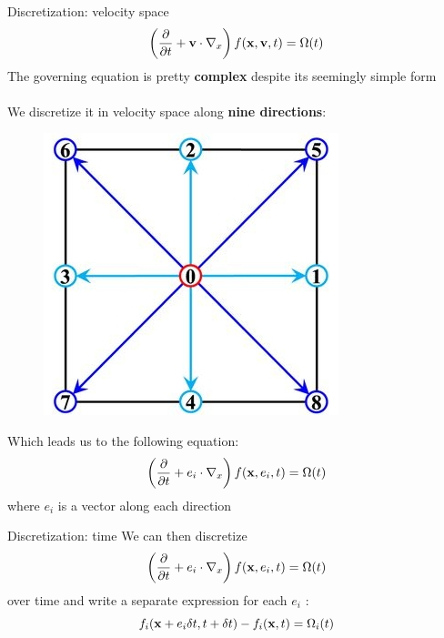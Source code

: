\documentclass[9pt]{beamer}
\begin{document}
\begin{frame}[t]{Discretization: velocity space}
\begin{equation*}
\left( \frac{\partial}{\partial t}
      + {\bf v}\cdot\nabla_x\right)f({\bf x}, {\bf v}, t) = \Omega(t)
\end{equation*}
The governing equation is pretty \textbf{complex} despite its seemingly simple form \\~\\

We discretize it in velocity space along \textbf{nine directions}:
\begin{figure}
\includegraphics[scale=0.25]{images/d2q9}
\centering
\end{figure}

Which leads us to the following equation:
\begin{equation*}
\left( \frac{\partial}{\partial t}
      +  e_i \cdot\nabla_x\right)f({\bf x}, e_i, t) = \Omega(t)
\end{equation*}
where $e_i$ is a vector along each direction
\end{frame}


\begin{frame}[t]{Discretization: time}
We can then discretize
\begin{equation*}
\left( \frac{\partial}{\partial t}
      +  e_i \cdot\nabla_x\right)f({\bf x}, e_i, t) = \Omega(t)
\end{equation*}
over time and write a separate expression for each $e_i$ : 
\begin{equation*}
f_i({\bf x} + e_i \delta t, t + \delta t)- f_i({\bf x}, t) = \Omega_i(t)
\end{equation*}
\end{frame}
\end{document}
